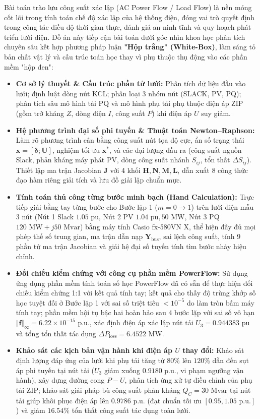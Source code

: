 \documentclass[12pt,a4paper,oneside]{report}
\begin{document}
Bài toán trào lưu công suất xác lập (AC Power Flow / Load Flow) là nền móng cốt lõi trong tính toán chế độ xác lập của hệ thống điện, đóng vai trò quyết định trong công tác điều độ thời gian thực, đánh giá an ninh tĩnh và quy hoạch phát triển lưới điện. Đồ án này tiếp cận bài toán dưới góc nhìn khoa học phân tích chuyên sâu kết hợp phương pháp luận \textbf{"Hộp trắng" (White-Box)}, làm sáng tỏ bản chất vật lý và cấu trúc toán học thay vì phụ thuộc thụ động vào các phần mềm "hộp đen":
\begin{itemize}
    \item \textbf{Cơ sở lý thuyết \& Cấu trúc phần tử lưới:} Phân tích dữ liệu đầu vào lưới; định luật dòng nút KCL; phân loại 3 nhóm nút (SLACK, PV, PQ); phân tích sâu mô hình tải PQ và mô hình phụ tải phụ thuộc điện áp ZIP (gồm trở kháng $Z$, dòng điện $I$, công suất $P$) khi điện áp $U$ suy giảm.
    \item \textbf{Hệ phương trình đại số phi tuyến \& Thuật toán Newton--Raphson:} Làm rõ phương trình cân bằng công suất nút tọa độ cực, ẩn số trạng thái $\mathbf{x} = [\boldsymbol{\delta}; \mathbf{U}]$, nghiệm tối ưu $\mathbf{x}^*$, và các đại lượng đầu ra (công suất nguồn Slack, phản kháng máy phát PV, dòng công suất nhánh $S_{ij}$, tổn thất $\Delta S_{ij}$). Thiết lập ma trận Jacobian $\mathbf{J}$ với 4 khối $\mathbf{H}, \mathbf{N}, \mathbf{M}, \mathbf{L}$, dẫn xuất 8 công thức đạo hàm riêng giải tích và lưu đồ giải lặp chuẩn mực.
    \item \textbf{Tính toán thủ công từng bước minh bạch (Hand Calculation):} Trực tiếp giải bằng tay từng bước cho Bước lặp 1 ($m = 0 \to 1$) trên lưới điện mẫu 3 nút (Nút 1 Slack $1.05\text{ pu}$, Nút 2 PV $1.04\text{ pu}, 50\text{ MW}$, Nút 3 PQ $120\text{ MW} + j50\text{ Mvar}$) bằng máy tính Casio fx-580VN X, thể hiện đầy đủ mọi phép thế số trung gian, ma trận dẫn nạp $\mathbf{Y}_{\text{bus}}$, sai lệch công suất, tính 9 phần tử ma trận Jacobian và giải hệ đại số tuyến tính tìm bước nhảy hiệu chỉnh.
    \item \textbf{Đối chiếu kiểm chứng với công cụ phần mềm PowerFlow:} Sử dụng ứng dụng phần mềm tính toán số học PowerFlow đã có sẵn để thực hiện đối chiếu kiểm chứng 1:1 với kết quả tính tay; kết quả cho thấy độ trùng khớp số học tuyệt đối ở Bước lặp 1 với sai số triệt tiêu $< 10^{-5}$ do làm tròn bấm máy tính tay; phần mềm hội tụ bậc hai hoàn hảo sau 4 bước lặp với sai số vô hạn $\Vert \mathbf{f} \Vert_\infty = 6.22 \times 10^{-15}\text{ p.u.}$, xác định điện áp xác lập nút tải $U_3 = 0.944383\text{ pu}$ và tổng tổn thất tác dụng $\Delta P_{\text{loss}} = 6.4522\text{ MW}$.
    \item \textbf{Khảo sát các kịch bản vận hành khi điện áp $U$ thay đổi:} Khảo sát định lượng đáp ứng của lưới khi phụ tải tăng từ $80\%$ lên $120\%$ dẫn đến sụt áp phi tuyến tại nút tải ($U_3$ giảm xuống $0.9180\text{ p.u.}$, vi phạm ngưỡng vận hành), xây dựng đường cong $P-U$, phân tích ứng xử tự điều chỉnh của phụ tải ZIP; khảo sát giải pháp bù công suất phản kháng $Q_C = 30\text{ Mvar}$ tại nút tải giúp khôi phục điện áp lên $0.9786\text{ p.u.}$ (đạt chuẩn tối ưu $[0.95, 1.05\text{ p.u.}]$) và giảm $16.54\%$ tổn thất công suất tác dụng toàn lưới.
\end{itemize}
\end{document}
